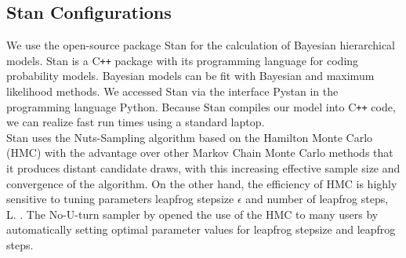 \subsection{Stan Configurations}
We use the open-source package Stan for the calculation of Bayesian hierarchical models. Stan is a C\texttt{++} package with its programming language for coding probability models. Bayesian models can be fit with Bayesian and maximum likelihood methods. We accessed Stan via the interface Pystan in the programming language Python. Because Stan compiles our model into C\texttt{++} code, we can realize fast run times using a standard laptop.\\
Stan uses the Nuts-Sampling algorithm based on the Hamilton Monte Carlo (HMC) with the advantage over other Markov Chain Monte Carlo methods that it produces distant candidate draws, with this increasing effective sample size and convergence of the algorithm.
On the other hand, the efficiency of HMC is highly sensitive to tuning parameters leapfrog stepsize $\epsilon$ and number of leapfrog steps, L. \cite{neal2011}. %
The No-U-turn sampler by \cite{hoffman2014} opened the use of the HMC to many users by automatically setting optimal parameter values for leapfrog stepsize and leapfrog steps. \\
